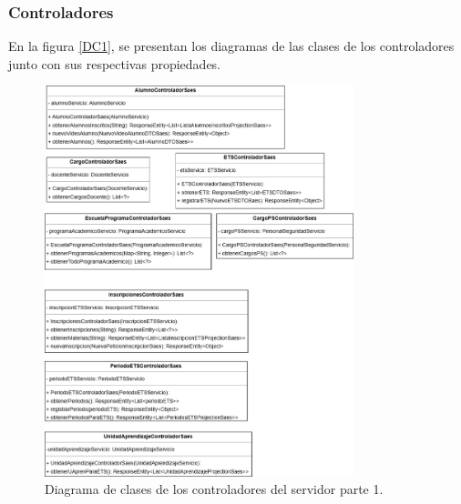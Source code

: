 \subsubsection{Controladores}
En la figura \ref{DC1}, se presentan los diagramas de las clases de los controladores junto con sus respectivas propiedades.

\begin{figure}[htbp!]
	\begin{center}
		\includegraphics[width=0.8\textwidth]{Clases/Controlador1.png}
		\caption{Diagrama de clases de los controladores del servidor parte 1.}
		\label{fig:DC1}
	\end{center}
\end{figure}

